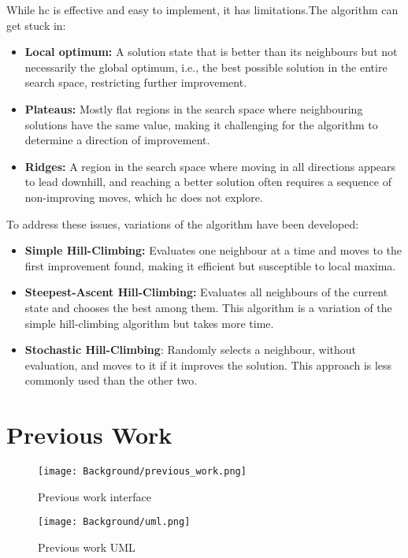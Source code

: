 While \ac{hc} is effective and easy to implement, it has limitations.The algorithm can get stuck in:

\begin{itemize}
\item \textbf{Local optimum:} A solution state that is better than its neighbours but not necessarily the global optimum, i.e., the best possible solution in the entire search space, restricting further improvement.
\item \textbf{Plateaus:} Mostly flat regions in the search space where neighbouring solutions have the same value, making it challenging for the algorithm to determine a direction of improvement.
\item \textbf{Ridges:} A region in the search space where moving in all directions appears to lead downhill, and reaching a better solution often requires a sequence of non-improving moves, which \ac{hc} does not explore.
\end{itemize}

To address these issues, variations of the algorithm have been developed:

\begin{itemize}
\item \textbf{Simple Hill-Climbing:} Evaluates one neighbour at a time and moves to the first improvement found, making it efficient but susceptible to local maxima.
\item \textbf{Steepest-Ascent Hill-Climbing:} Evaluates all neighbours of the current state and chooses the best among them. This algorithm is a variation of the simple hill-climbing algorithm but takes more time.
\item \textbf{Stochastic Hill-Climbing}: Randomly selects a neighbour, without evaluation, and moves to it if it improves the solution. This approach is less commonly used than the other two.
\end{itemize}

\section{Previous Work}

\begin{figure}
      \centering
      \texttt{[image: Background/previous\_work.png]}
      \caption[Previous work interface]
      {Previous work interface}
      \label{fig:previous_work_interface}
\end{figure}

\begin{figure}
      \centering
      \texttt{[image: Background/uml.png]}
      \caption[Previous work UML]
      {Previous work UML}
      \label{fig:previous_work_uml}
\end{figure}

